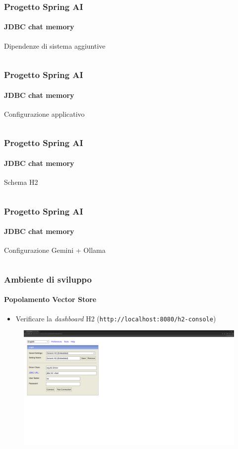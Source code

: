 %
\begin{frame}[t,fragile] \frametitle{Progetto Spring AI}
    \framesubtitle{JDBC chat memory}
        \begin{block}{Dipendenze di sistema aggiuntive}
			{\tiny\inputminted{xml}{code/pom-3.xml}}
    	\end{block}
\end{frame}
%
\begin{frame}[t,fragile] \frametitle{Progetto Spring AI}
    \framesubtitle{JDBC chat memory}
        \begin{block}{Configurazione applicativo}
			{\tiny\inputminted{yaml}{code/application-2.yml}}
    	\end{block}
\end{frame}
%
\begin{frame}[t,fragile] \frametitle{Progetto Spring AI}
    \framesubtitle{JDBC chat memory}
        \begin{block}{Schema H2}
			{\tiny\inputminted{sql}{code/schema-h2.sql}}
    	\end{block}
\end{frame}
%
\begin{frame}[t,fragile] \frametitle{Progetto Spring AI}
    \framesubtitle{JDBC chat memory}
    	\vspace*{-.7cm}
        \begin{block}{Configurazione Gemini + Ollama}
			{\tiny\inputminted{java}{code/MemoryChatClientConfig.java}}
    	\end{block}
\end{frame}
%
\begin{frame}[t,fragile] \frametitle{Ambiente di sviluppo}
\framesubtitle{Popolamento Vector Store}
	\vspace*{-.5cm}
    {\footnotesize
    \begin{itemize}
        \item[\alert{\faExclamationTriangle}] Verificare la \textit{dashboard} H2 (\texttt{http://localhost:8080/h2-console})
    \end{itemize}
    }
    \vfill
    \begin{minipage}[b]{\textwidth}
		\centering
		    \begin{figure}[ht]
			    \includegraphics[width=\textwidth, frame]{img/h2-console.png}
		    \end{figure}
	\end{minipage}
\end{frame}
